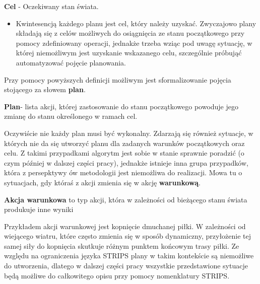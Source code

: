     \begin{definition}
    \label{Cel}
        \textbf{Cel} - Oczekiwany stan świata.
    \end{definition}
    \begin{itemize}
        \item Kwintesencją każdego planu jest cel, który należy uzyskać. Zwyczajowo plany składają się z celów możliwych do
        osiągnięcia ze stanu początkowego przy pomocy zdefiniowany operacji, jednakże trzeba wziąc pod uwagę sytuację, w której 
        niemożliwym jest uzyskanie wskazanego celu, szczególnie próbująć automatyzować pojęcie planowania.
    \end{itemize} 
    Przy pomocy powyższych definicji możliwym jest sformalizowanie pojęcia stojącego za słowem \textbf{plan}. 
    \begin{definition}
    \label{Plan}
    \textbf{Plan}- lista akcji, której zastosowanie do stanu początkowego powoduje jego zmianę do stanu określonego w ramach cel. 
    \end{definition}

    Oczywiście nie każdy plan musi być wykonalny. Zdarzają się również sytuacje, w których nie da się utworzyć planu dla zadanych warunków 
    początkowych oraz celu. Z takimi przypadkami algorytm jest sobie w stanie sprawnie poradzić (o czym później w dalszej części pracy), 
    jednakże istnieje inna grupa przypadków, która z persepktywy ów metodologii jest niemożliwa do realizacji. 
    Mowa tu o sytuacjach, gdy któraś z akcji zmienia się w akcję \textbf{warunkową}.
    \begin{definition}
        \label{Akcja warunkowa}
        \textbf{Akcja warunkowa} to typ akcji, która w zależności od bieżącego stanu świata produkuje inne wyniki
    \end{definition}

    Przykładem akcji warunkowej jest kopnięcie dmuchanej piłki. W zależności od wiejącego wiatru, które często zmienia się w sposób dynamiczny, 
    przyłożenie tej samej siły do kopnięcia skutkuje różnym punktem końcowym trasy piłki. Ze względu na ograniczenia języka STRIPS plany w 
    takim kontekście są niemożliwe do utworzenia, dlatego w dalszej części pracy wszystkie przedstawione sytuacje będą możliwe do całkowitego 
    opisu przy pomocy nomenklatury STRIPS.
    
